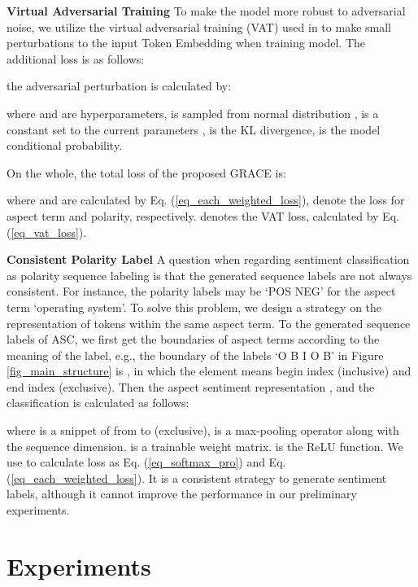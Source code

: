 \documentclass[11pt,a4paper]{article}
\begin{document}
\noindent
\textbf{Virtual Adversarial Training}\quad 
To make the model more robust to adversarial noise, we utilize the virtual adversarial training (VAT) used in \cite{Miyato2016} to make small perturbations  to the input Token Embedding  when training model. The additional loss is as follows:

the adversarial perturbation  is calculated by:

where  and  are hyperparameters,  is sampled from normal distribution ,  is a constant set to the current parameters ,  is the KL divergence,  is the model conditional probability.

On the whole, the total loss of the proposed GRACE is:

where  and  are calculated by Eq. (\ref{eq_each_weighted_loss}), denote the loss for aspect term and polarity, respectively.  denotes the VAT loss, calculated by Eq. (\ref{eq_vat_loss}).

\noindent
\textbf{Consistent Polarity Label}\quad 
A question when regarding sentiment classification as polarity sequence labeling is that the generated sequence labels are not always consistent. For instance, the polarity labels may be `POS NEG' for the aspect term `operating system'. To solve this problem, we design a strategy on the representation of tokens within the same aspect term. To the generated sequence labels of ASC, we first get the boundaries of aspect terms according to the meaning of the label, e.g., the boundary of the labels `O B I O B' in Figure \ref{fig_main_structure} is , in which the element  means begin index (inclusive) and end index (exclusive). Then the aspect sentiment representation , and the classification is calculated as follows:

where  is a snippet of  from  to  (exclusive),  is a max-pooling operator along with the sequence dimension.  is a trainable weight matrix.  is the ReLU function. We use  to calculate loss as Eq. (\ref{eq_softmax_pro}) and Eq. (\ref{eq_each_weighted_loss}). It is a consistent strategy to generate sentiment labels, although it cannot improve the performance in our preliminary experiments.

\section{Experiments}
\label{sec_experiments}
\end{document}
